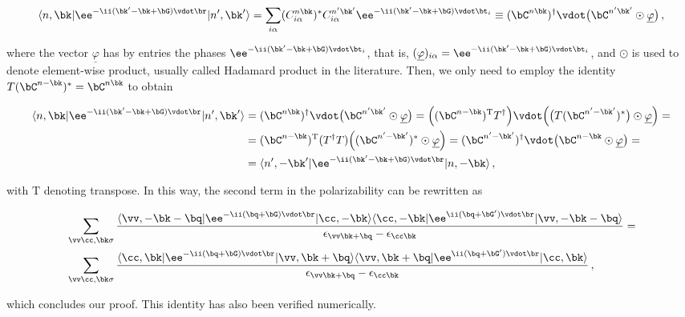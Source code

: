 \begin{equation}
     \langle n,\bk | \ee^{-\ii(\bk' - \bk + \bG) \vdot \br} | n',\bk' \rangle = \sum_{i \alpha} (C_{i \alpha}^{n \bk})^* C_{i \alpha}^{n' \bk'}  \ee^{-\ii(\bk' - \bk + \bG)  \vdot \bt_i} \equiv (\bC^{n \bk})^{\dagger} \vdot \big(\bC^{n' \bk'} \odot \underline{\varphi} \big) \,,
\end{equation}

\noindent where the vector $\underline{\varphi}$ has by entries the phases $\ee^{-\ii(\bk' - \bk + \bG)  \vdot \bt_i}$, that is, $(\underline{\varphi})_{i\alpha} = \ee^{-\ii(\bk' - \bk + \bG)  \vdot \bt_i}$, and $\odot$ is used to denote element-wise product, usually called Hadamard product in the literature.
Then, we only need to employ the identity $T (\bC^{n -\bk})^* = \bC^{n \bk}$ to obtain

\begin{align}
    \langle n,\bk | \ee^{-\ii(\bk' - \bk + \bG) \vdot \br} | n',\bk' \rangle & =   (\bC^{n \bk})^{\dagger} \vdot \big(\bC^{n' \bk'} \odot \underline{\varphi} \big) =  \Big((\bC^{n -\bk})^{\mathrm{T}} T^{\dagger} \Big) \vdot \Big( \big(T (\bC^{n' -\bk'})^* \big) \odot \underline{\varphi} \Big) = \notag \\
    & =  (\bC^{n -\bk})^{\mathrm{T}} (T^{\dagger}  T) \Big((\bC^{n' -\bk'})^* \odot \underline{\varphi}\Big) = (\bC^{n' -\bk'})^{\dagger} \vdot \big(\bC^{n -\bk} \odot \underline{\varphi}\big) = \notag \\
    & =  \langle n',-\bk' | \ee^{-\ii(\bk' - \bk + \bG) \vdot \br} | n,-\bk \rangle \,,
\end{align}

\noindent with $\mathrm{T}$ denoting transpose.
In this way, the second term in the polarizability can be rewritten as

\begin{equation}
\begin{aligned}
    & \sum_{\vv \cc,\bk \sigma} \frac{\langle \vv,-\bk-\bq|\ee^{-\ii(\bq+\bG)\vdot\br}|\cc,-\bk\rangle \langle \cc,-\bk|\ee^{\ii(\bq+\bG')\vdot\br}|\vv,-\bk-\bq\rangle}{\epsilon_{\vv \bk+\bq} - \epsilon_{\cc \bk}} = \\
    & \sum_{\vv \cc,\bk \sigma} \frac{\langle \cc,\bk |\ee^{-\ii(\bq+\bG)\vdot\br}|\vv,\bk+\bq\rangle \langle \vv,\bk+\bq|\ee^{\ii(\bq+\bG')\vdot\br}|\cc,\bk\rangle}{\epsilon_{\vv \bk+\bq} - \epsilon_{\cc \bk}}\,,
\end{aligned}
\end{equation}

\noindent which concludes our proof.
This identity has also been verified numerically.


